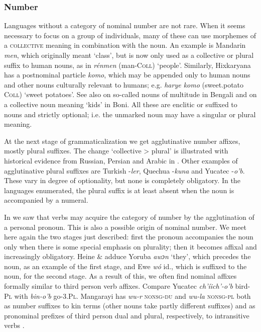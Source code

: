 \subsubsection{Number} \label{sec:3.3.1.1}
Languages without a category of nominal number are not rare. When it seems necessary to focus on a group of individuals, many of these can use morphemes of a \textsc{collective} meaning in combination with the noun. An example is Mandarin \textit{men}, which originally meant ‘class’, but is now only used as a collective or plural suffix to human nouns, as in \textit{rénmen} (man-\textsc{Coll}) ‘people’. Similarly, Hixkaryana has a postnominal particle \textit{komo}, which may be appended only to human nouns and other nouns culturally relevant to humans; e.g. \textit{harye komo} (sweet.potato \textsc{Coll}) ‘sweet potatoes’. See also \citet[§~2.1]{Kölver1982a} on so-called nouns of multitude in Bengali and \citet[272]{HeineEtAl1984} on a collective noun meaning ‘kids’ in Boni. All these are enclitic or suffixed to nouns and strictly optional; i.e. the unmarked noun may have a singular or plural meaning.

At the next stage of grammaticalization we get agglutinative number affixes, mostly plural suffixes. The change ‘collective {\textgreater} plural’ is illustrated with historical evidence from Russian, Persian and Arabic in \citealt[52]{Kuryłowicz1965}. Other examples of agglutinative plural suffixes are Turkish -\textit{ler}, Quechua -\textit{kuna} and Yucatec -\textit{o'b}. These vary in degree of optionality, but none is completely obligatory. In the languages enumerated, the plural suffix is at least absent when the noun is accompanied by a numeral.

In  we saw that verbs may acquire the category of number by the agglutination of a personal pronoun. This is also a possible origin of nominal number. We meet here again the two stages just described: first the pronoun accompanies the noun only when there is some special emphasis on plurality; then it becomes affixal and increasingly obligatory. Heine \& \citet[234]{HeineEtAl1984} adduce Yoruba \textit{awɔn} ‘they’, which precedes the noun, as an example of the first stage, and Ewe \textit{wó} id., which is suffixed to the noun, for the second stage. As a result of this, we often find nominal affixes formally similar to third person verb affixes. Compare Yucatec \textit{ch'íich'-o'b} bird-\textsc{Pl} with \textit{bin-o'b} go-3.\textsc{Pl}. Mangarayi has \textit{wu-r} \textsc{nonsg-du} and \textit{wu-la} \textsc{nonsg-pl} both as number suffixes to kin terms (other nouns take partly different suffixes) and as pronominal prefixes of third person dual and plural, respectively, to intransitive verbs \citep[88f, 160f]{Merlan1982}.

